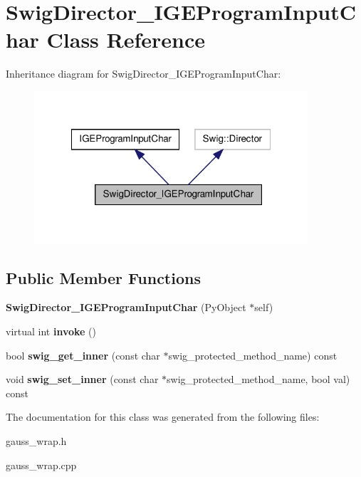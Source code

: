 \hypertarget{class_swig_director___i_g_e_program_input_char}{\section{Swig\-Director\-\_\-\-I\-G\-E\-Program\-Input\-Char Class Reference}
\label{class_swig_director___i_g_e_program_input_char}
}


Inheritance diagram for Swig\-Director\-\_\-\-I\-G\-E\-Program\-Input\-Char\-:\nopagebreak
\begin{figure}[H]
\begin{center}
\leavevmode
\includegraphics[width=288pt]{class_swig_director___i_g_e_program_input_char__inherit__graph}
\end{center}
\end{figure}
\subsection*{Public Member Functions}
\begin{DoxyCompactItemize}
\item 
\hypertarget{class_swig_director___i_g_e_program_input_char_a76f3e00d54cd8cd2c2db59350dc02048}{{\bfseries Swig\-Director\-\_\-\-I\-G\-E\-Program\-Input\-Char} (Py\-Object $\ast$self)}\label{class_swig_director___i_g_e_program_input_char_a76f3e00d54cd8cd2c2db59350dc02048}

\item 
\hypertarget{class_swig_director___i_g_e_program_input_char_af541688b2798b177ec1252b834025d5c}{virtual int {\bfseries invoke} ()}\label{class_swig_director___i_g_e_program_input_char_af541688b2798b177ec1252b834025d5c}

\item 
\hypertarget{class_swig_director___i_g_e_program_input_char_ac53ba8f12599c9886c6f3ad0d56ff3d1}{bool {\bfseries swig\-\_\-get\-\_\-inner} (const char $\ast$swig\-\_\-protected\-\_\-method\-\_\-name) const }\label{class_swig_director___i_g_e_program_input_char_ac53ba8f12599c9886c6f3ad0d56ff3d1}

\item 
\hypertarget{class_swig_director___i_g_e_program_input_char_a9ddee6e5160c6f34e94b66c81d01eece}{void {\bfseries swig\-\_\-set\-\_\-inner} (const char $\ast$swig\-\_\-protected\-\_\-method\-\_\-name, bool val) const }\label{class_swig_director___i_g_e_program_input_char_a9ddee6e5160c6f34e94b66c81d01eece}

\end{DoxyCompactItemize}


The documentation for this class was generated from the following files\-:\begin{DoxyCompactItemize}
\item 
gauss\-\_\-wrap.\-h\item 
gauss\-\_\-wrap.\-cpp\end{DoxyCompactItemize}
